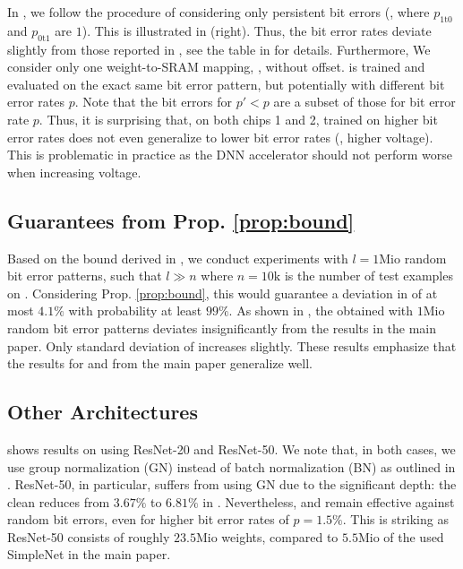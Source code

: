 In , we follow the procedure of  considering only persistent bit errors (\ie, where $p_{\text{1t0}}$ and $p_{\text{0t1}}$ are $1$). This is illustrated in  (right). Thus, the bit error rates deviate slightly from those reported in , see the table in  for details. Furthermore, We consider only one weight-to-SRAM mapping, \ie, without offset. \Pattern is trained and evaluated on the exact same bit error pattern, but potentially with different bit error rates $p$. Note that the bit errors for $p' < p$ are a subset of those for bit error rate $p$. Thus, it is surprising that, on both chips 1 and 2, \Pattern trained on higher bit error rates does not even generalize to lower bit error rates (\ie, higher voltage). This is problematic in practice as the DNN accelerator should not perform worse when increasing voltage.

\subsection{Guarantees from Prop. \ref{prop:bound}}
\label{subsec:experiments-stress}

Based on the bound derived in , we conduct experiments with $l = 1\text{Mio}$ random bit error patterns, such that $l \gg n$ where $n = \text{10k}$ is the number of test examples on \CifarT. Considering Prop. \ref{prop:bound}, this would guarantee a deviation in \RTE of at most $4.1\%$ with probability at least $99\%$. As shown in , the obtained \RTE with $1\text{Mio}$ random bit error patterns deviates insignificantly from the results in the main paper. Only standard deviation of \RTE increases slightly. These results emphasize that the results for \Clipping and \Random from the main paper generalize well.

\subsection{Other Architectures}
\label{subsec:supp-experiments-architectures}

 shows results on \CifarT using ResNet-20 and ResNet-50. We note that, in both cases, we use group normalization (GN) instead of batch normalization (BN) as outlined in . ResNet-50, in particular, suffers from using GN due to the significant depth: the clean \TE reduces from $3.67\%$ to $6.81\%$ in . Nevertheless, \Clipping and \Random remain effective against random bit errors, even for higher bit error rates of $p = 1.5\%$. This is striking as ResNet-50 consists of roughly $23.5\text{Mio}$ weights, compared to $5.5\text{Mio}$ of the used SimpleNet in the main paper.

